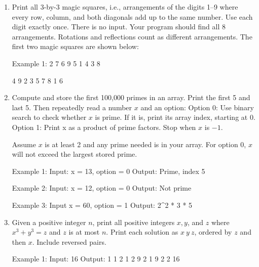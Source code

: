 \begin{enumerate}
\begin{consolethree}
Example 2:
Input: 2
Output:
* *
 *
  
Example 3:
Input: 4
Output:
*   *
 * *
  *
\end{consolethree}
\newpage


\item 
Print all 3-by-3 magic squares, i.e.,
arrangements of the digits 1–9 where every row, column, and both diagonals add
up to the same number.
Use each digit exactly once.
There is no input.
Your program should find all 8 arrangements. Rotations and reflections count as different arrangements.
The first two magic squares are shown below:
\begin{consolethree}
Example 1:
2 7 6
9 5 1
4 3 8

4 9 2
3 5 7
8 1 6
\end{consolethree}
\newpage


\item 
Compute and store the first 100,000 primes in an array. Print the first 5 and last 5.
Then repeatedly read a number $x$ and an option:
Option 0: Use binary search to check whether $x$ is prime.
If it is, print its array index, starting at 0.
Option 1: Print x as a product of prime factors.
Stop when $x$ is $-1$.

Assume $x$ is at least 2 and any prime needed is in your array.
For option $0$, $x$ will not exceed the largest stored prime.

\begin{consolethree}
Example 1:
Input: x = 13, option = 0
Output: Prime, index 5

Example 2:
Input: x = 12, option = 0
Output: Not prime

Example 3:
Input x = 60, option = 1
Output: 2^2 * 3 * 5
\end{consolethree}
\newpage



\item 
Given a positive integer $n$, print all positive integers $x, y$, and $z$ where
$x^3 + y^3 = z$ and $z$ is at most $n$.
Print each solution as $x\ y\ z$, ordered by $z$ and then $x$.
Include reversed pairs.

\begin{consolethree}
Example 1:
Input: 16
Output:
1 1 2
1 2 9
2 1 9
2 2 16


\end{consolethree}
\end{enumerate}
